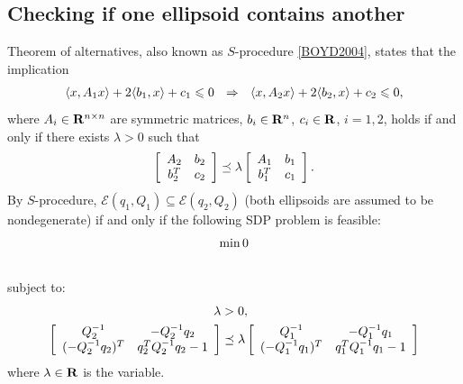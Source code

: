 \documentclass[letterpaper,10pt,english]{sphinxmanual}
\begin{document}
\subsection{Checking if one ellipsoid contains another}
\label{chap_ellcalc:checking-if-one-ellipsoid-contains-another}
Theorem of alternatives, also known as $S$-procedure {\hyperref[chap_ellcalc:boyd2004]{{[}BOYD2004{]}}},
states that the implication
\begin{gather}
\begin{split}\langle x, A_1x\rangle + 2\langle b_1,x\rangle + c_1 \leqslant0
~~ \Rightarrow ~~
\langle x, A_2x\rangle + 2\langle b_2,x\rangle + c_2 \leqslant0,\end{split}\notag
\end{gather}
where $A_i\in{\bf R}^{n\times n}$ are symmetric matrices,
$b_i\in{\bf R}^n$, $c_i\in{\bf R}$, $i=1,2$, holds if
and only if there exists $\lambda>0$ such that
\begin{gather}
\begin{split}\left[\begin{array}{cc}
A_2 & b_2\\
b_2^T & c_2\end{array}\right]
\preceq
\lambda\left[\begin{array}{cc}
A_1 & b_1\\
b_1^T & c_1\end{array}\right].\end{split}\notag
\end{gather}
By $S$-procedure,
${\mathcal E}(q_1,Q_1)\subseteq{\mathcal E}(q_2,Q_2)$ (both
ellipsoids are assumed to be nondegenerate) if and only if the following
SDP problem is feasible:
\begin{gather}
\begin{split}\min 0\end{split}\notag\\\begin{split}\end{split}\notag
\end{gather}
subject to:
\begin{gather}
\begin{split}\begin{aligned}
\lambda & >  0, \\
\left[\begin{array}{cc}
Q_2^{-1} & -Q_2^{-1}q_2\\
(-Q_2^{-1}q_2)^T & q_2^TQ_2^{-1}q_2-1\end{array}\right]
& \preceq
\lambda \left[\begin{array}{cc}
Q_1^{-1} & -Q_1^{-1}q_1\\
(-Q_1^{-1}q_1)^T & q_1^TQ_1^{-1}q_1-1\end{array}\right]\end{aligned}\end{split}\notag
\end{gather}
where $\lambda\in{\bf R}$ is the variable.
\end{document}
